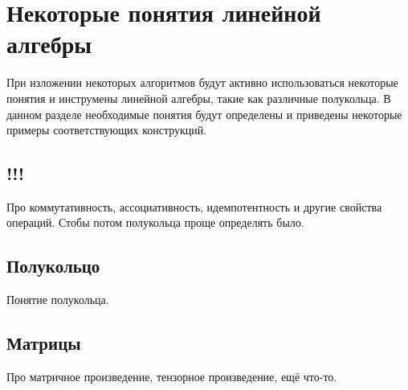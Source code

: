 \chapter{Некоторые понятия линейной алгебры}

При изложении некоторых алгоритмов будут активно использоваться некоторые понятия и инструмены линейной алгебры, такие как различные полукольца.
В данном разделе необходимые понятия будут определены и приведены некоторые примеры соответствующих конструкций.

\section{!!!}
Про коммутативность, ассоциативность, идемпотентность и другие свойства операций.
Стобы потом полукольца проще определять было.


\section{Полукольцо}
Понятие полукольца.

\section{Матрицы}
Про матричное произведение, тензорное произведение, ещё что-то.